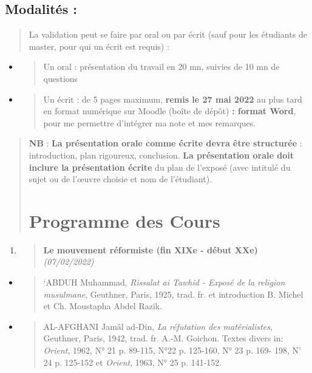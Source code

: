 \hypertarget{modalituxe9s}{%
\subsection{Modalités :}\label{modalituxe9s}}

\begin{quote}
La validation peut se faire par oral ou par écrit (sauf pour les
étudiants de master, pour qui un écrit est requis) :
\end{quote}

\begin{itemize}
\item
  \begin{quote}
  Un oral : présentation du travail en 20 mn, suivies de 10 mn de
  questions
  \end{quote}
\item
  \begin{quote}
  Un écrit : de 5 pages maximum, \textbf{remis le 27 mai 2022} au plus
  tard en format numérique sur Moodle (boîte de dépôt) \textbf{: format
  Word}, pour me permettre d'intégrer ma note et mes remarques.
  \end{quote}
\end{itemize}

\begin{quote}
\textbf{NB} : \textbf{La présentation orale comme écrite devra être
structurée} : introduction, plan rigoureux, conclusion. \textbf{La
présentation orale doit inclure la présentation écrite} du plan de
l'exposé (avec intitulé du sujet ou de l'œuvre choisie et nom de
l'étudiant).

\section{Programme des Cours}
\end{quote}





\begin{enumerate}
\def\labelenumi{\arabic{enumi}.}
\item
  \begin{quote}
  \textbf{{Le mouvement réformiste (fin XIXe - début XXe)}}
  \emph{(07/02/2022)}
  \end{quote}
\end{enumerate}

\begin{itemize}
\item
  \begin{quote}
  `ABDUH Muhammad, \emph{Rissalat ai Tawhid - Exposé de la religion
  musulmane}, Geuthner, Paris, 1925, trad. fr. et introduction B. Michel
  et Ch. Moustapha Abdel Razik.
  \end{quote}
\item
  \begin{quote}
  AL-AFGHANI Jamâl ad-Din, \emph{La réfutation des matérialistes},
  Geuthner, Paris, 1942, trad. fr. A.-M. Goichon. Textes divers in:
  \emph{Orient}, 1962, N° 21 p. 89-115, N°22 p. 125-160, N° 23 p. 169-
  198, N' 24 p. 125-152 et \emph{Orient}, 1963, N° 25 p. 141-152.
  \end{quote}
\end{itemize}

